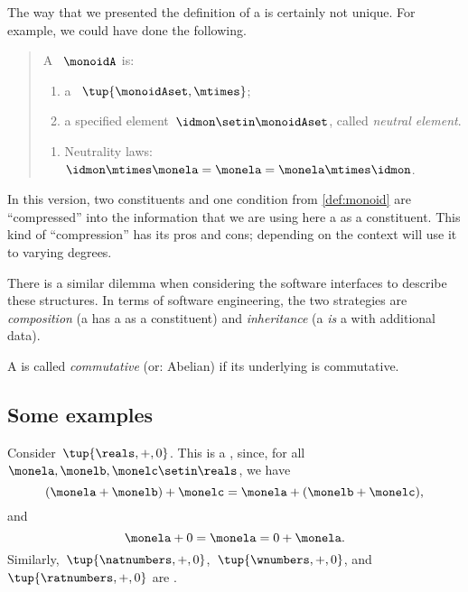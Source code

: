 \begin{remark}
    The way that we presented the definition of a  is certainly not unique.
    For example, we could have done the following.
    \begin{quote}
        A ~$\monoidA$ is:
        \begin{body}
            \constit
            \begin{enumerate}
                \item a ~$\tup{\monoidAset, \mtimes}$;
                \item a specified element~$\idmon\setin \monoidAset$, called \emph{neutral element}.
            \end{enumerate}
            \condit
            \begin{enumerate}
                \item Neutrality laws:~$\idmon\mtimes \monela= \monela= \monela \mtimes \idmon$.
            \end{enumerate}
        \end{body}
    \end{quote}
    In this version, two constituents and one condition from \cref{def:monoid} are ``compressed'' into the information that we are using here a  as a constituent.
    This kind of ``compression'' has its pros and cons; depending on the context will use it to varying degrees.

    There is a similar dilemma when considering the software interfaces to describe these structures.
    In terms of software engineering, the two strategies are \emph{composition} (a  has a  as a constituent) and \emph{inheritance} (a  \emph{is} a  with additional data).

\end{remark}

\begin{remark}
    A  is called \emph{commutative} (or: Abelian) if its underlying  is commutative.
\end{remark}

\subsection{Some examples}

\begin{example}
    Consider~$\tup{\reals,+,0}$.
    This is a , since, for all~$\monela,\monelb, \monelc \setin \reals$, we have
    \begin{equation}
        (\monela+\monelb)
        +\monelc=\monela+(\monelb+\monelc),
    \end{equation}
    and
    \begin{equation}
        \monela+0=\monela=0+\monela.
    \end{equation}
    Similarly,~$\tup{\natnumbers, +,0}$,~$\tup{\wnumbers, +,0}$, and~$\tup{\ratnumbers, +,0}$ are .
\end{example}

